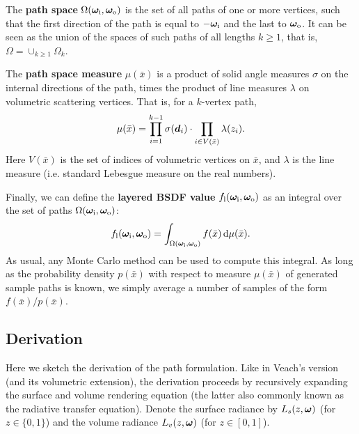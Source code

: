 The {\bf path space} $\Omega(\bm\omega_\mathrm{i}, \bm\omega_\mathrm{o})$ is the set of all paths of one or more vertices, such that the first direction of the path is equal to $-\bm\omega_\mathrm{i}$ and the last to $\bm\omega_\mathrm{o}$. It can be seen as the union of the spaces of such paths of all lengths $k \geq 1$, that is, $\Omega = \cup_{k \geq 1} \Omega_k$.

The {\bf path space measure} $\mu(\bar x)$ is a product of solid angle measures $\sigma$ on the internal directions of the path, times the product of line measures $\lambda$ on volumetric scattering vertices.
That is, for a $k$-vertex path,
\begin{equation}
\mu(\bar x) = \prod_{i=1}^{k-1} \sigma(\bm{d}_i) \cdot \prod_{i \in V(\bar x)} \lambda(z_i).
\end{equation}
Here $V(\bar x)$ is the set of indices of volumetric vertices on $\bar x$, and $\lambda$ is the line measure (i.e. standard Lebesgue measure on the real numbers).

Finally, we can define the {\bf layered BSDF value} $f_\mathrm{l}(\bm\omega_\mathrm{i}, \bm\omega_\mathrm{o})$ as an integral over the set of paths $\Omega(\bm\omega_\mathrm{i}, \bm\omega_\mathrm{o})$:
\begin{equation}
\label{eq:pathintegral}
	f_\mathrm{l}(\bm\omega_\mathrm{i}, \bm\omega_\mathrm{o}) = \int_{\Omega(\bm\omega_\mathrm{i}, \bm\omega_\mathrm{o})} f(\bar x) \,\mathrm{d} \mu(\bar x).
\end{equation}
As usual, any Monte Carlo method can be used to compute this integral. As long as the probability density $p(\bar x)$ with respect to measure $\mu(\bar x)$ of generated sample paths is known, we simply average a number of samples of the form $f(\bar x) / p(\bar x)$.


\subsection{Derivation}

Here we sketch the derivation of the path formulation.
Like in Veach's version (and its volumetric extension), the derivation proceeds by recursively expanding the surface and volume rendering equation (the latter also commonly known as the radiative transfer equation). Denote the surface radiance by $L_s(z, \bm\omega)$ (for $z \in \{0, 1\}$) and the volume radiance $L_v(z, \bm\omega)$ (for $z \in [0,1]$).

